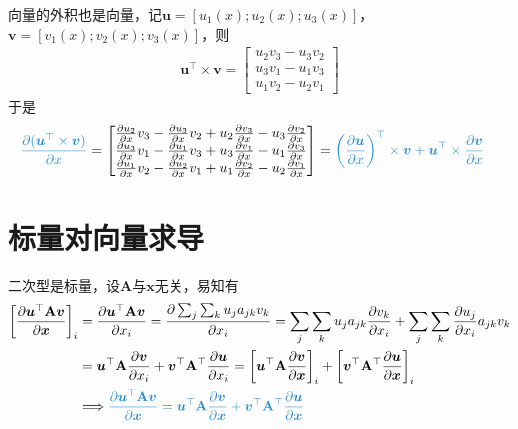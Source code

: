\documentclass{ctexart}
\newcommand{\blue}[1]{\textcolor{Solarized-blue}{#1}}
\theoremstyle{definition}
\def \uv {\bm{u}}
\def \vv {\bm{v}}
\def \xv {\bm{x}}
\def \Av {\mathbf{A}}
\begin{document}
向量的外积也是向量，记$\uv = [u_1(x); u_2(x); u_3(x)]$，$\vv = [v_1(x); v_2(x); v_3(x)]$，则
\begin{align*}
    \uv^\top \times \vv = \begin{bmatrix}
        u_2 v_3 - u_3 v_2 \\ u_3 v_1 - u_1 v_3 \\ u_1 v_2 - u_2 v_1
    \end{bmatrix}
\end{align*}
于是
\begin{align*}
    \blue{\frac{\partial (\uv^\top \times \vv)}{\partial x}} & = \begin{bmatrix}
        \frac{\partial u_2}{\partial x} v_3 - \frac{\partial u_3}{\partial x} v_2 + u_2 \frac{\partial v_3}{\partial x} - u_3 \frac{\partial v_2}{\partial x} \\
        \frac{\partial u_3}{\partial x} v_1 - \frac{\partial u_1}{\partial x} v_3 + u_3 \frac{\partial v_1}{\partial x} - u_1 \frac{\partial v_3}{\partial x} \\
        \frac{\partial u_1}{\partial x} v_2 - \frac{\partial u_2}{\partial x} v_1 + u_1 \frac{\partial v_2}{\partial x} - u_2 \frac{\partial v_1}{\partial x} \\
    \end{bmatrix} = \blue{\left( \frac{\partial \uv}{\partial x} \right)^\top \times \vv + \uv^\top \times \frac{\partial \vv}{\partial x}}
\end{align*}


\section{标量对向量求导}

二次型是标量，设$\Av$与$\xv$无关，易知有
\begin{align*}
    \left[ \frac{\partial \uv^\top \Av \vv}{\partial \xv} \right]_i & = \frac{\partial \uv^\top \Av \vv}{\partial x_i} = \frac{\partial \sum_j \sum_k u_j a_{jk} v_k}{\partial x_i} = \sum_j \sum_k u_j a_{jk} \frac{\partial v_k}{\partial x_i} + \sum_j \sum_k \frac{\partial u_j}{\partial x_i} a_{jk} v_k         \\
                                                                    & = \uv^\top \Av \frac{\partial \vv}{\partial x_i} + \vv^\top \Av^\top \frac{\partial \uv}{\partial x_i} = \left[ \uv^\top \Av \frac{\partial \vv}{\partial \xv} \right]_i + \left[ \vv^\top \Av^\top \frac{\partial \uv}{\partial \xv} \right]_i \\
                                                                    & \Longrightarrow \blue{\frac{\partial \uv^\top \Av \vv}{\partial \xv} = \uv^\top \Av \frac{\partial \vv}{\partial \xv} + \vv^\top \Av^\top \frac{\partial \uv}{\partial \xv}}
\end{align*}
\end{document}
